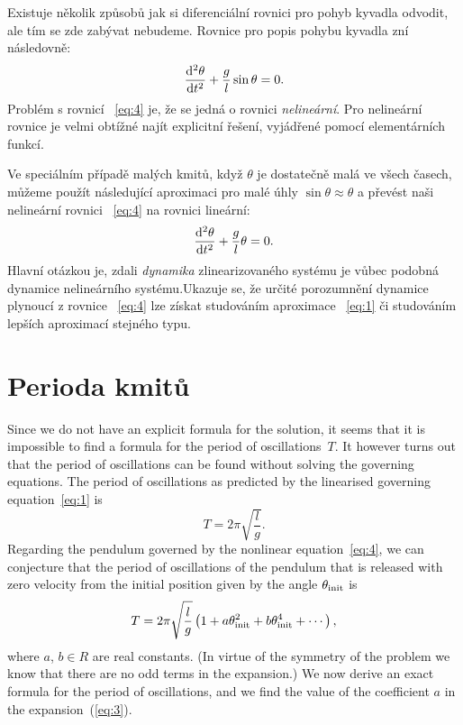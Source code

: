 \documentclass[reqno, a4paper]{amsart}
\begin{document}
Existuje několik způsobů jak si diferenciální rovnici pro pohyb kyvadla odvodit, ale tím se zde zabývat nebudeme. Rovnice pro popis pohybu kyvadla zní následovně:
\begin{equation}
  \label{eq:4}
  \frac{\mathrm{d}^2 {\theta}}{\mathrm{d} {t}^2} + \frac{g}{l} \sin \theta = 0.
\end{equation}
Problém s rovnicí ~\eqref{eq:4} je, že se jedná o rovnici \emph{nelineární}. Pro nelineární rovnice je velmi obtížné najít explicitní řešení, vyjádřené pomocí elementárních funkcí.

Ve speciálním případě malých kmitů, když $\theta$ je dostatečně malá ve všech časech, můžeme použít následující aproximaci pro malé úhly $\sin \theta \approx \theta$ a převést naši nelineární rovnici ~\eqref{eq:4} na rovnici lineární:
\begin{equation}
  \label{eq:1}
  \frac{\mathrm{d}^2 {\theta}}{\mathrm{d} {t}^2} + \frac{g}{l} \theta = 0.
\end{equation}
Hlavní otázkou je, zdali \emph{dynamika} zlinearizovaného systému je vůbec podobná dynamice nelineárního systému.Ukazuje se, že určité porozumnění dynamice plynoucí z rovnice ~\eqref{eq:4} lze získat studováním aproximace ~\eqref{eq:1} či studováním lepších aproximací stejného typu.

\section{Perioda kmitů}
\label{sec:Perioda kmitů}
Since we do not have an explicit formula for the solution, it seems that it is impossible to find a formula for the period of oscillations~$T$. It however turns out that the period of oscillations can be found without solving the governing equations. The period of oscillations as predicted by the linearised governing equation~\eqref{eq:1} is
\begin{equation}
  \label{eq:2}
  T
  =
  2\pi
  \sqrt{
    \frac{l}{g}
  }
  .
\end{equation}
Regarding the pendulum governed by the nonlinear equation~\eqref{eq:4}, we can conjecture that the period of oscillations of the pendulum  that is released with zero velocity from the initial position given by the angle $\theta_{\mathrm{init}}$ is 
\begin{equation}
  \label{eq:3}
  T
  =
  2\pi
  \sqrt{
    \frac{l}{g}
  }
  \left(
    1
    +
    a \theta_{\mathrm{init}}^2
    +
    b \theta_{\mathrm{init}}^4
    +
    \cdots
  \right)
  ,
\end{equation}
where $a$, $b \in R$ are real constants. (In virtue of the symmetry of the problem we know that there are no odd terms in the expansion.) We now derive an exact formula for the period of oscillations, and we find the value of the coefficient $a$ in the expansion~(\ref{eq:3}).
\end{document}
